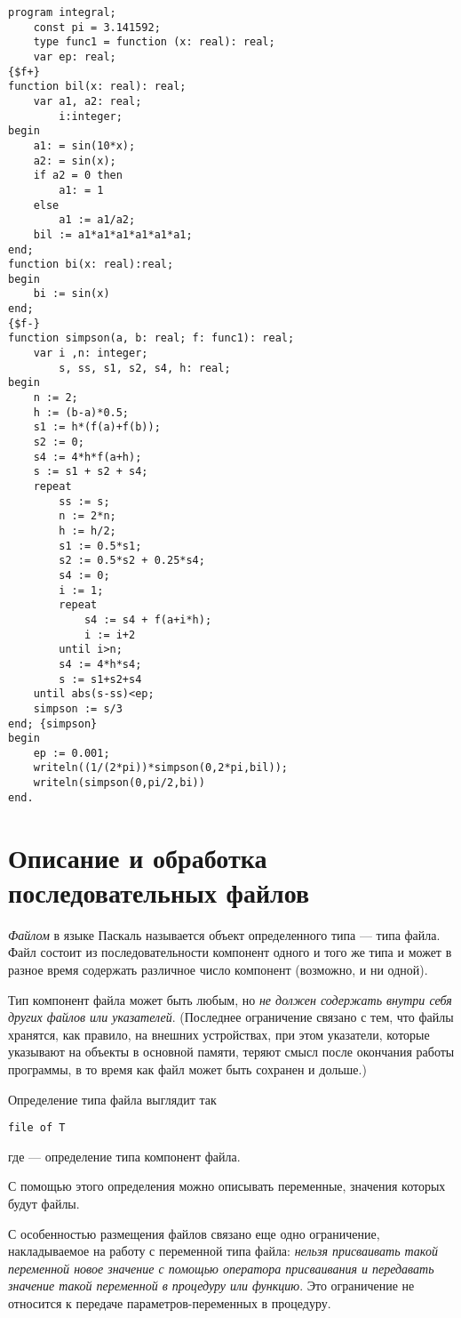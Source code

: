 \documentclass[12pt,a4paper]{article}
\theoremstyle{plain}
\theoremstyle{definition}
\theoremstyle{remark}
\begin{document}
\begin{verbatim}
program integral;
    const pi = 3.141592;
    type func1 = function (x: real): real;
    var ep: real;
{$f+}
function bil(x: real): real;
    var a1, a2: real;
        i:integer;
begin
    a1: = sin(10*x);
    a2: = sin(x);
    if a2 = 0 then
        a1: = 1
    else
        a1 := a1/a2;
    bil := a1*a1*a1*a1*a1*a1;
end;
function bi(x: real):real;
begin
    bi := sin(x)
end;
{$f-}
function simpson(a, b: real; f: func1): real;
    var i ,n: integer;
        s, ss, s1, s2, s4, h: real;
begin
    n := 2;
    h := (b-a)*0.5;
    s1 := h*(f(a)+f(b));
    s2 := 0;
    s4 := 4*h*f(a+h); 
    s := s1 + s2 + s4;
    repeat
        ss := s;
        n := 2*n;
        h := h/2;
        s1 := 0.5*s1;
        s2 := 0.5*s2 + 0.25*s4;
        s4 := 0; 
        i := 1;
        repeat
            s4 := s4 + f(a+i*h);
            i := i+2
        until i>n;
        s4 := 4*h*s4;
        s := s1+s2+s4
    until abs(s-ss)<ep;
    simpson := s/3
end; {simpson}
begin
    ep := 0.001;
    writeln((1/(2*pi))*simpson(0,2*pi,bil));
    writeln(simpson(0,pi/2,bi))
end.
\end{verbatim}

\section{Описание и обработка последовательных файлов}
\textit{Файлом} в языке Паскаль называется объект определенного типа --- типа файла. Файл состоит из последовательности компонент одного и того же типа и может в разное время содержать различное число компонент (возможно, и ни одной).

Тип компонент файла может быть любым, но \emph{не должен содержать внутри себя других файлов или указателей}. (Последнее ограничение связано с тем, что файлы хранятся, как правило, на внешних устройствах, при этом указатели, которые указывают на объекты в основной памяти, теряют смысл после окончания работы программы, в то время как файл может быть сохранен и дольше.)

Определение типа файла выглядит так
\begin{verbatim}
file of T
\end{verbatim}
где \verb@T@ --- определение типа компонент файла.

С помощью этого определения можно описывать переменные, значения которых будут файлы.

С особенностью размещения файлов связано еще одно ограничение, накладываемое на работу с переменной типа файла: \emph{нельзя присваивать такой переменной новое значение с помощью оператора присваивания и передавать значение такой переменной в процедуру или функцию}. Это ограничение не относится к передаче параметров-переменных в процедуру.
\end{document}
